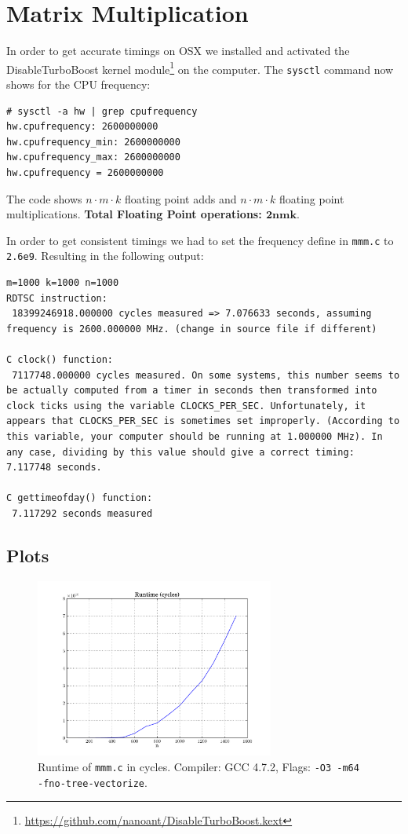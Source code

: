 \documentclass[portrait,a4paper]{article}
\begin{document}
\section{Matrix Multiplication}
In order to get accurate timings on OSX we installed and activated the DisableTurboBoost kernel module\footnote{\url{https://github.com/nanoant/DisableTurboBoost.kext}} on the computer. The \lstinline{sysctl} command now shows for the CPU frequency:
\begin{lstlisting}[caption=Bash output of the sysctl command]
# sysctl -a hw | grep cpufrequency
hw.cpufrequency: 2600000000
hw.cpufrequency_min: 2600000000
hw.cpufrequency_max: 2600000000
hw.cpufrequency = 2600000000
\end{lstlisting}


The code shows $n\cdot m\cdot k$ floating point adds and $n\cdot m\cdot k$ floating point multiplications. \textbf{Total Floating Point operations: $\mathbf{2nmk}$}.

In order to get consistent timings we had to set the frequency define in \lstinline{mmm.c} to \lstinline{2.6e9}. Resulting in the following output:
\begin{lstlisting}[caption=Execution of the \lstinline{mmm.c} code compiled with GCC 4.7.2 and the flags \lstinline{-O3 -m64 -fno-tree-vectorize}.]
m=1000 k=1000 n=1000
RDTSC instruction:
 18399246918.000000 cycles measured => 7.076633 seconds, assuming frequency is 2600.000000 MHz. (change in source file if different)

C clock() function:
 7117748.000000 cycles measured. On some systems, this number seems to be actually computed from a timer in seconds then transformed into clock ticks using the variable CLOCKS_PER_SEC. Unfortunately, it appears that CLOCKS_PER_SEC is sometimes set improperly. (According to this variable, your computer should be running at 1.000000 MHz). In any case, dividing by this value should give a correct timing: 7.117748 seconds.

C gettimeofday() function:
 7.117292 seconds measured
\end{lstlisting}
\subsection{Plots}
\begin{figure}[H]
\centering
\includegraphics[width=0.7\textwidth]{mmm/Runtimecycles.pdf}
\caption{Runtime of \lstinline{mmm.c} in cycles. Compiler: GCC 4.7.2, Flags: \lstinline{-O3 -m64 -fno-tree-vectorize}.}
\end{figure}
\end{document}

